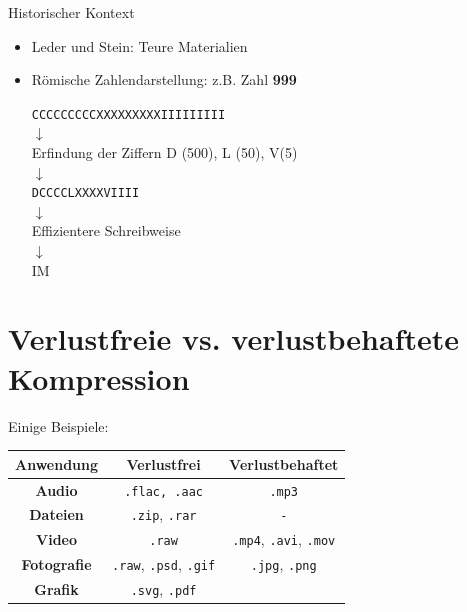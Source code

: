 Historischer Kontext
\begin{itemize}
	\item Leder und Stein: Teure Materialien
	\item Römische Zahlendarstellung: z.B. Zahl \textbf{999}
	\begin{center}
		\texttt{CCCCCCCCCXXXXXXXXXIIIIIIIII}\\
		$\downarrow$\\
		Erfindung der Ziffern D (500), L (50), V(5)\\
		$\downarrow$\\
		\texttt{DCCCCLXXXXVIIII} \\
		$\downarrow$\\
		Effizientere Schreibweise\\
		$\downarrow$\\
		IM
	\end{center}
\end{itemize}

\section{Verlustfreie vs. verlustbehaftete Kompression}
Einige Beispiele:
\begin{table}[H]
	\centering
	\begin{tabular}{c||c|c}
		\textbf{Anwendung} & \textbf{Verlustfrei} & \textbf{Verlustbehaftet} \\\midrule
		\textbf{Audio} & \texttt{.flac, .aac} & \texttt{.mp3}\\\hline
		\textbf{Dateien} & \texttt{.zip}, \texttt{.rar} & \texttt{-}\\\hline
		\textbf{Video} & \texttt{.raw} & \texttt{.mp4}, \texttt{.avi}, \texttt{.mov} \\\hline
		\textbf{Fotografie} & \texttt{.raw}, \texttt{.psd}, \texttt{.gif} & \texttt{.jpg}, \texttt{.png}\\\hline
		\textbf{Grafik} & \texttt{.svg}, \texttt{.pdf}
	\end{tabular}
\end{table}

